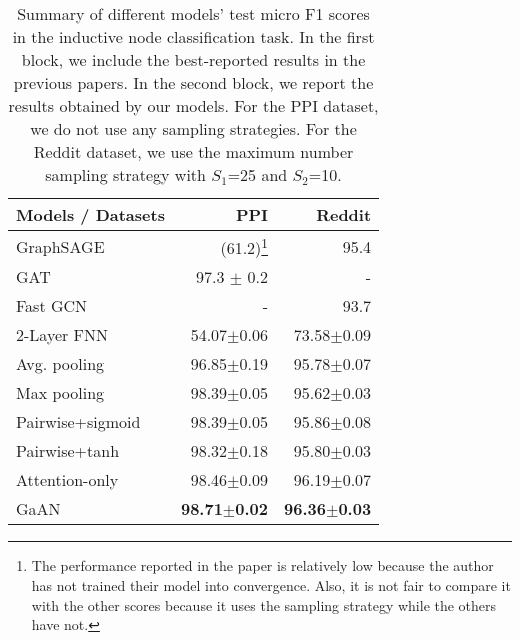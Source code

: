 \documentclass{article}
\begin{document}
	\begin{table}[!tb]
		\centering
		\caption{Summary of different models' test micro F1 scores in the inductive node classification task. In the first block, we include the best-reported results in the previous papers. In the second block, we report the results obtained by our models. For the PPI dataset, we do not use any sampling strategies. For the Reddit dataset, we use the maximum number sampling strategy with $S_1$=25 and $S_2$=10.}
\begin{tabular}{l r r}
			\hline 
			Models / Datasets & PPI &  Reddit\\
			\hline \hline
			GraphSAGE~{\tiny \citep{hamilton2017inductive}}  & (61.2)\footnote{The performance reported in the paper is relatively low because the author has not trained their model into convergence. Also, it is not fair to compare it with the other scores because it uses the sampling strategy while the others have not.} & 95.4 \\ 
			GAT~{\tiny \citep{velivckovic2017graph}}  & 97.3 $\pm$ 0.2 & - \\ 
			Fast GCN~{\tiny \citep{chen2018fastgcn}} & - &93.7  \\  \hline
			2-Layer FNN   & 54.07$\pm$0.06 &73.58$\pm$0.09 \\ 
			Avg. pooling  &96.85$\pm$0.19 &95.78$\pm$0.07 \\ 
			Max pooling   &98.39$\pm$0.05 &95.62$\pm$0.03 \\
			Pairwise+sigmoid & 98.39$\pm$0.05 &  95.86$\pm$0.08 \\
			Pairwise+tanh    & 98.32$\pm$0.18 & 95.80$\pm$0.03 \\ 
			Attention-only   & 98.46$\pm$0.09 &96.19$\pm$0.07 \\ 
			GaAN  & \textbf{98.71$\pm$0.02} & \textbf{96.36$\pm$0.03}  \\ \hline 
		\end{tabular}
\label{table:result_node_classifation}
	\end{table}
	
\end{document}
